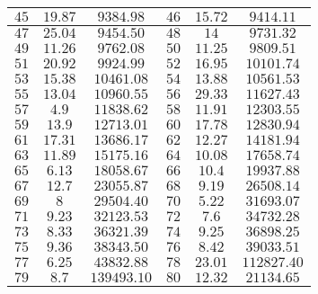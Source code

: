 \documentclass[10pt,a4paper]{article}
\begin{document}
\begin{enumerate}[1.]
\begin{center}
\begin{longtable}{|c|c|c||c|c|c|}
        $45$ & $19.87$ & $9384.98$ & $46$ & $15.72$ & $9414.11$ \\ \hline
        $47$ & $25.04$ & $9454.50$ & $48$ & $14$ & $9731.32$ \\ \hline
        $49$ & $11.26$ & $9762.08$ & $50$ & $11.25$ & $9809.51$ \\ \hline
        $51$ & $20.92$ & $9924.99$ & $52$ & $16.95$ & $10101.74$ \\ \hline
        $53$ & $15.38$ & $10461.08$ & $54$ & $13.88$ & $10561.53$ \\ \hline
        $55$ & $13.04$ & $10960.55$ & $56$ & $29.33$ & $11627.43$ \\ \hline
        $57$ & $4.9$ & $11838.62$ & $58$ & $11.91$ & $12303.55$ \\ \hline
        $59$ & $13.9$ & $12713.01$ & $60$ & $17.78$ & $12830.94$ \\ \hline
        $61$ & $17.31$ & $13686.17$ & $62$ & $12.27$ & $14181.94$ \\ \hline
        $63$ & $11.89$ & $15175.16$ & $64$ & $10.08$ & $17658.74$ \\ \hline
        $65$ & $6.13$ & $18058.67$ & $66$ & $10.4$ & $19937.88$ \\ \hline
        $67$ & $12.7$ & $23055.87$ & $68$ & $9.19$ & $26508.14$ \\ \hline
        $69$ & $8$ & $29504.40$ & $70$ & $5.22$ & $31693.07$ \\ \hline
        $71$ & $9.23$ & $32123.53$ & $72$ & $7.6$ & $34732.28$ \\ \hline
        $73$ & $8.33$ & $36321.39$ & $74$ & $9.25$ & $36898.25$ \\ \hline
        $75$ & $9.36$ & $38343.50$ & $76$ & $8.42$ & $39033.51$ \\ \hline
        $77$ & $6.25$ & $43832.88$ & $78$ & $23.01$ & $112827.40$ \\ \hline
        $79$ & $8.7$ & $139493.10$ & $80$ & $12.32$ & $21134.65$ \\ \hline
    \end{longtable}
\end{center}
\end{enumerate}
\end{document}
